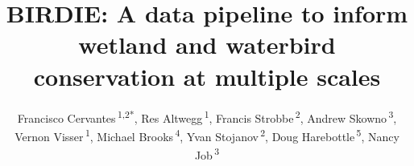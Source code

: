\documentclass[utf8]{frontiersSCNS}
\def\Authors{
  Francisco Cervantes\,\textsuperscript{1,2*},
  Res Altwegg\,\textsuperscript{1},
  Francis Strobbe\,\textsuperscript{2},
  Andrew Skowno\,\textsuperscript{3},
  Vernon Visser\,\textsuperscript{1},
  Michael Brooks\,\textsuperscript{4},
  Yvan Stojanov\,\textsuperscript{2},
  Doug Harebottle\,\textsuperscript{5},
  Nancy Job\,\textsuperscript{3}}
\def\firstAuthorLast{Cervantes {et~al.}}
\begin{document}
\onecolumn
{}


\title[BIRDIE Biodiversity Datapipeline]{BIRDIE: A data pipeline to
inform wetland and waterbird conservation at multiple scales}
\author[\firstAuthorLast]{\Authors}
\address{} %
\correspondance{} %

\extraAuth{}%


\maketitle
\end{document}
